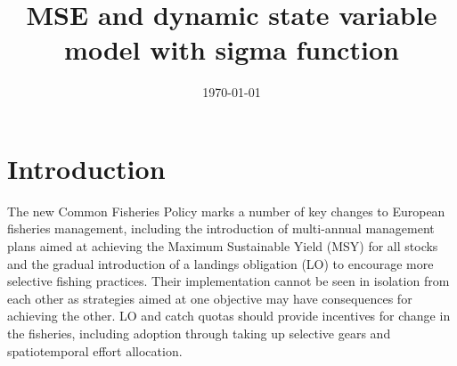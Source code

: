 \documentclass[12pt,oneline,a4paper,numbib]{ouparticle}
\numberwithin{equation}{subsection} %
\begin{document}
\title{MSE and dynamic state variable model with sigma function}

\author{%
\address{European Commission, Joint Research Centre (JRC), Sustainable Resources Directorate, Water and Marine Resources Unit, Via Enrico Fermi 2749, 21027 Ispra, Italy.}
\and
{}
\address{Wageningen Marine Research, PO Box 68, 1970 AB IJmuiden, The Netherlands.}
}


\date{\today}


\maketitle


\section{Introduction}
\label{sec1}

The new Common Fisheries Policy marks a number of key changes to European fisheries management, including the introduction of multi-annual management plans aimed at achieving the Maximum Sustainable Yield (MSY) for all stocks and the gradual introduction of a landings obligation (LO) to encourage more selective fishing practices. Their implementation cannot be seen in isolation from each other as strategies aimed at one objective may have consequences for achieving the other. LO and catch quotas should provide incentives for change in the fisheries, including adoption through taking up selective gears and spatiotemporal effort allocation.
\end{document}
